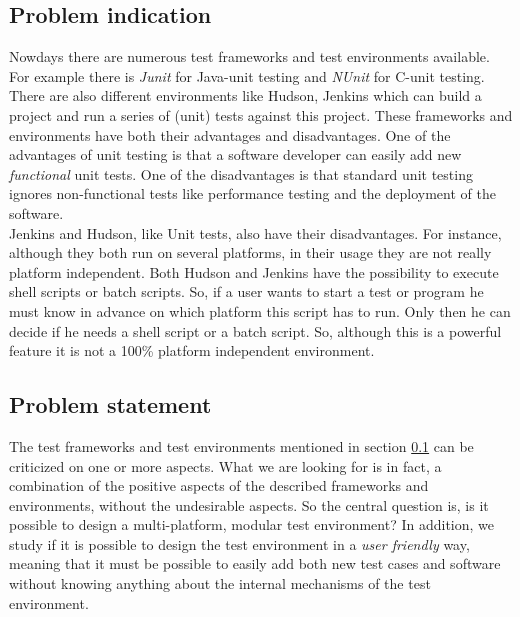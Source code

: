 \documentclass{article}
\newcommand{\CS}{C\nolinebreak\hspace{-.05em}\raisebox{.6ex}{\bf \#}}
\begin{document}
\subsection{Problem indication}
\label{subsec:Problemindication}
Nowdays there are numerous test frameworks and test environments available. For example there is \emph{Junit}\cite{Junit} for Java-unit testing and \emph{NUnit}\cite{Nunit} for \CS{}-unit testing.
There are also different environments like Hudson\cite{HudsonDoc,Hudson}, Jenkins\cite{JenkinsDoc} which can build a project and run a series of (unit) tests against this project. 
These frameworks and environments have both their advantages and disadvantages. One of the advantages of unit testing is that a software developer can easily add new \emph{functional} unit tests.
One of the disadvantages is that standard unit testing ignores non-functional tests like performance testing and the deployment of the software.\\

\noindent Jenkins and Hudson, like Unit tests, also have their
disadvantages. For instance, although they both run on several platforms, in their usage they are not really platform independent. Both Hudson and Jenkins have the possibility to execute shell scripts or 
batch scripts. So, if a user wants to start a test or program he must know in advance on which platform this script has to run. Only then he can decide if he needs a shell script or a batch script. So, although 
this is a powerful feature it is not a 100\% platform independent environment.
 
\subsection{Problem statement}
\label{subsec:Problemstatement}
The test frameworks and test environments mentioned in section \ref{subsec:Problemindication} can be criticized on one or more aspects. What we are looking for is in fact, a combination
of the positive aspects of the described frameworks and environments, without the undesirable aspects. So the central question is, is it possible to design a
multi-platform, modular test environment? In addition, we study if it is possible to design the test environment in a \emph{user friendly} way, meaning that it must
be possible to easily add both new test cases and software without knowing anything about the internal mechanisms of the test environment.\\
\end{document}
